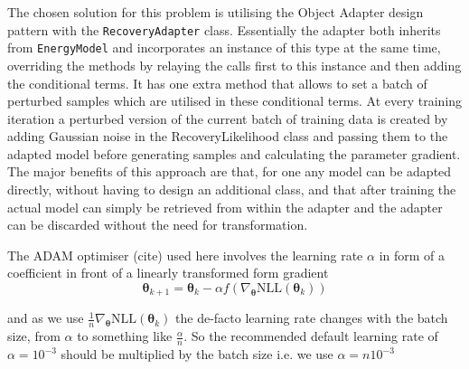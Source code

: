 The chosen solution for this problem is utilising the Object Adapter design pattern with the \texttt{RecoveryAdapter} class.
Essentially the adapter both inherits from \texttt{EnergyModel} and incorporates an instance of this type at the same time,
overriding the methods by relaying the calls first to this instance and then adding the conditional terms.
It has one extra method that allows to set a batch of perturbed samples which are utilised in these conditional terms.
At every training iteration a perturbed version of the current batch of training data is created by adding Gaussian noise in the RecoveryLikelihood class 
and passing them to the adapted model before generating samples and calculating the parameter gradient.
The major benefits of this approach are that, for one any model can be adapted directly, without having to design an additional class,
and that after training the actual model can simply be retrieved from within the adapter and the adapter can be discarded without the need for transformation.


The ADAM optimiser (cite) used here involves the learning rate $\alpha$ in form of a coefficient in front of a linearly transformed form gradient
\[
	\bm{\theta}_{k+1} = \bm{\theta}_k - \alpha f( \nabla_{\bm{\theta}} \text{NLL}(\bm{\theta}_k) )
\]

and as we use $\frac{1}{n} \nabla_{\bm{\theta}} \text{NLL}(\bm{\theta}_k)$ the de-facto learning rate changes with the batch size, 
from $\alpha$ to something like $\frac{\alpha}{n}$.
So the recommended default learning rate of $\alpha = 10^{-3}$ should be multiplied by the batch size i.e. we use $\alpha = n 10^{-3}$



























